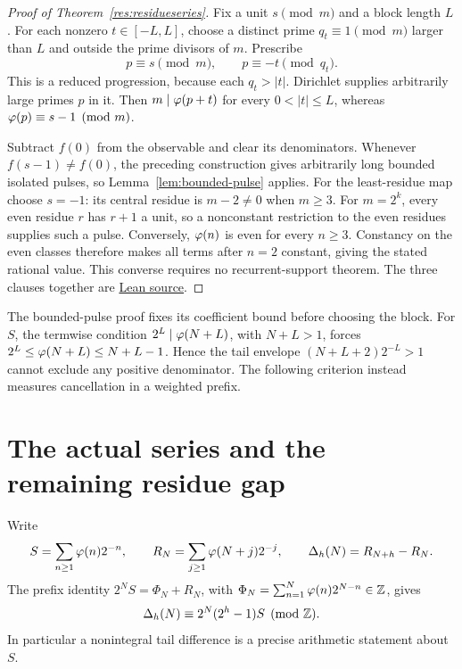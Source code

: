 \documentclass[11pt]{article}
\begin{document}
\begin{proof}[Proof of Theorem~\ref{res:residueseries}]
Fix a unit $s\pmod m$ and a block length $L$. For each nonzero
$t\in[-L,L]$, choose a distinct prime $q_t\equiv1\pmod m$ larger than $L$
and outside the prime divisors of $m$. Prescribe
\[
 p\equiv s\pmod m,\qquad p\equiv-t\pmod{q_t}.
\]
This is a reduced progression, because each $q_t>|t|$. Dirichlet supplies
arbitrarily large primes $p$ in it. Then $m\mid\varphi(p+t)$ for every
$0<|t|\le L$, whereas $\varphi(p)\equiv s-1\pmod m$.

Subtract $f(0)$ from the observable and clear its denominators. Whenever
$f(s-1)\ne f(0)$, the preceding construction gives arbitrarily long bounded
isolated pulses, so Lemma~\ref{lem:bounded-pulse} applies. For the
least-residue map choose $s=-1$: its central residue is $m-2\ne0$ when
$m\ge3$. For $m=2^k$, every even residue $r$ has $r+1$ a unit, so a
nonconstant restriction to the even residues supplies such a pulse.
Conversely, $\varphi(n)$ is even for every $n\ge3$. Constancy on the even
classes therefore makes all terms after $n=2$ constant, giving the stated
rational value. This converse requires no recurrent-support theorem.
The three clauses together are
\href{https://github.com/wcook04/plectis-erdos/blob/f36a98bf3d3e6f65f1074e3b800e3293d5b8a51a/ErdosProblems/Erdos249/PaperCompleteR7/RationalObservableClassification.lean#L277}{Lean source}.
\end{proof}
The bounded-pulse proof fixes its coefficient bound before choosing the block.
For $S$, the termwise condition $2^L\mid\varphi(N+L)$, with $N+L>1$, forces
$2^L\le\varphi(N+L)\le N+L-1$. Hence the tail envelope
$(N+L+2)2^{-L}>1$ cannot exclude any positive denominator.
The following criterion instead measures cancellation in a weighted prefix.

\section{The actual series and the remaining residue gap}\label{sec:carry-rank}
Write
\[
 S=\sum_{n\ge1}\varphi(n)2^{-n},\qquad
 R_N=\sum_{j\ge1}\varphi(N+j)2^{-j},\qquad
 \Delta_h(N)=R_{N+h}-R_N.
\]
The prefix identity $2^NS=\Phi_N+R_N$, with
$\Phi_N=\sum_{n=1}^N\varphi(n)2^{N-n}\in\mathbb{Z}$, gives
\begin{equation}\label{eq:tail-phase}
 \Delta_h(N)\equiv2^N(2^h-1)S\pmod\Z.
\end{equation}
In particular a nonintegral tail difference is a precise arithmetic
statement about $S$.
\end{document}
